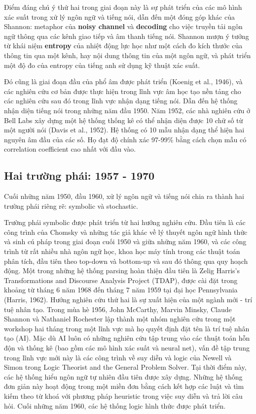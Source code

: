 Điểm đáng chú ý thứ hai trong giai đoạn này là sự phát triển của các mô hình xác suất trong xử lý ngôn ngữ và tiếng nói, dẫn đến một đóng góp khác của Shannon: metaphor của \textbf{noisy channel} và \textbf{decoding} cho việc truyền tải ngôn ngữ thông qua các kênh giao tiếp và âm thanh tiếng nói. Shannon mượn ý tưởng từ khái niệm \textbf{entropy} của nhiệt động lực học như một cách đo kích thước của thông tin qua một kênh, hay nội dung thông tin của một ngôn ngữ, và phát triển một độ đo của entropy của tiếng anh sử dụng kỹ thuật xác suất.

Đó cũng là giai đoạn đầu của phổ âm được phát triển (Koenig et al., 1946), và các nghiên cứu cơ bản được thực hiện trong lĩnh vực âm học tạo nền tảng cho các nghiên cứu sau đó trong lĩnh vực nhận dạng tiếng nói. Dẫn đến hệ thống nhận diện tiếng nói trong những năm đầu 1950. Năm 1952, các nhà nghiên cứu ở Bell Labs xây dựng một hệ thống thống kê có thể nhận diện được 10 chữ số từ một người nói (Davis et al., 1952). Hệ thống có 10 mẫu nhận dạng thể hiện hai nguyên âm đầu của các số. Họ đạt độ chính xác 97-99\% bằng cách chọn mẫu có correlation coefficient cao nhất với đầu vào.

\subsection{Hai trường phái: 1957 - 1970}

Cuối những năm 1950, đầu 1960, xử lý ngôn ngữ và tiếng nói chia ra thành hai trường phái riêng rẽ: symbolic và stochastic.

Trường phái symbolic được phát triển từ hai hướng nghiên cứu. Đầu tiên là các công trình của Chomsky và những tác giả khác về lý thuyết ngôn ngữ hình thức và sinh cú pháp trong giai đoạn cuối 1950 và giữa những năm 1960, và các công trình từ rất nhiều nhà ngôn ngữ học, khoa học máy tính trong các thuật toán phân tích, đầu tiên theo top-down và bottom-up và sau đó thông qua quy hoạch động. Một trong những hệ thống parsing hoàn thiện đầu tiên là Zelig Harris's Transformations and Discourse Analysis Project (TDAP), được cài đặt trong khoảng từ tháng 6 năm 1968 đến tháng 7 năm 1959 tại đại học Pennsylvania (Harris, 1962). Hướng nghiên cứu thứ hai là sự xuất hiện của một ngành mới - trí tuệ nhân tạo. Trong mùa hè 1956, John McCarthy, Marvin Minsky, Claude Shannon và Nathaniel Rochester lập thành một nhóm nghiên cứu trong một workshop hai tháng trong một lĩnh vực mà họ quyết định đặt tên là trí tuệ nhân tạo (AI). Mặc dù AI luôn có những nghiên cứu tập trung vào các thuật toán hỗn độn và thống kê (bao gồm các mô hình xác suất và neural net), vấn đề tập trung trong lĩnh vực mới này là các công trình về suy diễn và logic của Newell và Simon trong Logic Theorist and the General Problem Solver. Tại thời điểm này, các hệ thống hiểu ngôn ngữ tự nhiên đầu tiên được xây dựng. Những hệ thống đơn giản này hoạt động trong một miền đơn bằng cách kết hợp các luật và tìm kiếm theo từ khoá với phương pháp heuristic trong việc suy diễn và trả lời câu hỏi. Cuối những năm 1960, các hệ thống logic hình thức được phát triển.

